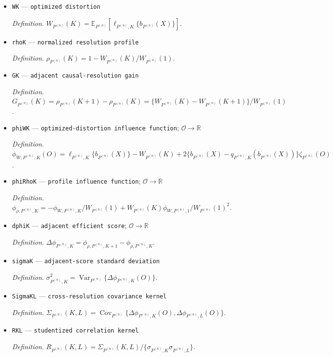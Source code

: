 \documentclass{article}
\begin{document}
\begin{itemize}
  \item \texttt{WK} --- \texttt{optimized distortion}
  \par\smallskip\noindent\emph{Definition.} \(W_{P^{(n)}}(K)=\mathbb E_{P^{(n)}}[\ell_{P^{(n)},K}\{b_{P^{(n)}}(X)\}]\).
  \item \texttt{rhoK} --- \texttt{normalized resolution profile}
  \par\smallskip\noindent\emph{Definition.} \(\rho_{P^{(n)}}(K)=1-W_{P^{(n)}}(K)/W_{P^{(n)}}(1)\).
  \item \texttt{GK} --- \texttt{adjacent causal-\allowbreak{}resolution gain}
  \par\smallskip\noindent\emph{Definition.} \(G_{P^{(n)}}(K)=\rho_{P^{(n)}}(K+1)-\rho_{P^{(n)}}(K)=\{W_{P^{(n)}}(K)-W_{P^{(n)}}(K+1)\}/W_{P^{(n)}}(1)\).
  \item \texttt{phiWK} --- \texttt{optimized-\allowbreak{}distortion influence function}; \(\mathcal O\to\mathbb R\)
  \par\smallskip\noindent\emph{Definition.} \(\phi_{W,P^{(n)},K}(O)=\ell_{P^{(n)},K}\{b_{P^{(n)}}(X)\}-W_{P^{(n)}}(K)+2\{b_{P^{(n)}}(X)-q_{P^{(n)},K}(b_{P^{(n)}}(X))\}\zeta_{P^{(n)}}(O)\).
  \item \texttt{phiRhoK} --- \texttt{profile influence function}; \(\mathcal O\to\mathbb R\)
  \par\smallskip\noindent\emph{Definition.} \(\phi_{\rho,P^{(n)},K}=-\phi_{W,P^{(n)},K}/W_{P^{(n)}}(1)+W_{P^{(n)}}(K)\phi_{W,P^{(n)},1}/W_{P^{(n)}}(1)^2\).
  \item \texttt{dphiK} --- \texttt{adjacent efficient score}; \(\mathcal O\to\mathbb R\)
  \par\smallskip\noindent\emph{Definition.} \(\Delta\phi_{P^{(n)},K}=\phi_{\rho,P^{(n)},K+1}-\phi_{\rho,P^{(n)},K}\).
  \item \texttt{sigmaK} --- \texttt{adjacent-\allowbreak{}score standard deviation}
  \par\smallskip\noindent\emph{Definition.} \(\sigma_{P^{(n)},K}^2=\operatorname{Var}_{P^{(n)}}\{\Delta\phi_{P^{(n)},K}(O)\}\).
  \item \texttt{SigmaKL} --- \texttt{cross-\allowbreak{}resolution covariance kernel}
  \par\smallskip\noindent\emph{Definition.} \(\Sigma_{P^{(n)}}(K,L)=\operatorname{Cov}_{P^{(n)}}\{\Delta\phi_{P^{(n)},K}(O),\Delta\phi_{P^{(n)},L}(O)\}\).
  \item \texttt{RKL} --- \texttt{studentized correlation kernel}
  \par\smallskip\noindent\emph{Definition.} \(R_{P^{(n)}}(K,L)=\Sigma_{P^{(n)}}(K,L)/\{\sigma_{P^{(n)},K}\sigma_{P^{(n)},L}\}\).

\end{itemize}
\end{document}
